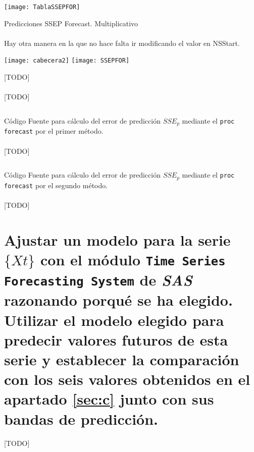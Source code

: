 \documentclass[a4paper, spanish]{article}
\begin{document}
    \begin{table}[htb!]
      \centering
      \texttt{[image: TablaSSEPFOR]}
      \caption{Predicciones SSEP Forecast. Multiplicativo}
      \label{}
    \end{table}

    \paragraph{}
    Hay otra manera en la que no hace falta ir modificando el valor en NSStart.

    \begin{table}[htb!]
      \centering
      \texttt{[image: cabecera2]}
      \texttt{[image: SSEPFOR]}
      \caption{[TODO]}
      \label{}
    \end{table}

    \paragraph{}
    [TODO]

    \begin{listing}[htb!]
      \centering
      \inputminted{SAS}{./res/code/e-prediction-forecast-method-1.sas}
      \caption{Código Fuente para cálculo del error de predicción $SSE_p$ mediante el \texttt{proc forecast} por el primer método.}
      \label{code:prediction_forecast_method_2}
    \end{listing}

    \paragraph{}
    [TODO]

    \begin{listing}[htb!]
      \centering
      \inputminted{SAS}{./res/code/e-prediction-forecast-method-2.sas}
      \caption{Código Fuente para cálculo del error de predicción $SSE_p$ mediante el \texttt{proc forecast} por el segundo método.}
      \label{code:prediction_forecast_method_2}
    \end{listing}

    \paragraph{}
    [TODO]

  \section{Ajustar un modelo para la serie $\{ Xt \}$ con el módulo \texttt{Time Series Forecasting System} de \emph{SAS} razonando porqué se ha elegido. Utilizar el modelo elegido para predecir valores futuros de esta serie y establecer la comparación con los seis valores obtenidos en el apartado \ref{sec:c} junto con sus bandas de predicción.}
  \label{sec:f}

    \paragraph{}
    [TODO]
\end{document}
